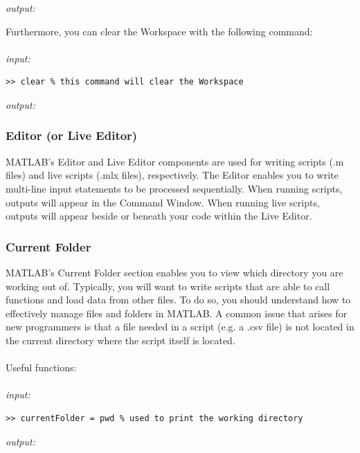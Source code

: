 \documentclass[../MATLAB_Primer.tex]{subfiles}
\begin{document}
\textit{output:}

\begin{center}
    
\end{center}
Furthermore, you can clear the Workspace with the following command:
\\ \\
\textit{input:}
\begin{lstlisting}[frame=single]
>> clear % this command will clear the Workspace
\end{lstlisting}

\textit{output:}

\begin{center}
    
\end{center}

\subsubsection{Editor (or Live Editor)}
MATLAB's Editor and Live Editor components are used for writing scripts (.m files) and live scripts (.mlx files), respectively. The Editor enables you to write multi-line input statements to be processed sequentially. When running scripts, outputs will appear in the Command Window. When running live scripts, outputs will appear beside or beneath your code within the Live Editor.

\subsubsection{Current Folder}
MATLAB's Current Folder section enables you to view which directory you are working out of. Typically, you will want to write scripts that are able to call functions and load data from other files. To do so, you should understand how to effectively manage files and folders in MATLAB.  A common issue that arises for new programmers is that a file needed in a script (e.g. a .csv file) is not located in the current directory where the script itself is located.  
\\ \\
Useful functions:
\\ \\
\textit{input:}
\begin{lstlisting}[frame=single]
>> currentFolder = pwd % used to print the working directory
\end{lstlisting}

\textit{output:}
\end{document}
